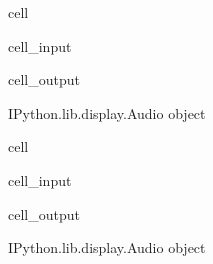 \documentclass[letterpaper,10pt,english]{jupyterBook}
\begin{document}
\begin{sphinxuseclass}{cell}\begin{sphinxVerbatimInput}

\begin{sphinxuseclass}{cell_input}
\begin{sphinxVerbatim}[commandchars=\\\{\}]
 
\end{sphinxVerbatim}

\end{sphinxuseclass}\end{sphinxVerbatimInput}
\begin{sphinxVerbatimOutput}

\begin{sphinxuseclass}{cell_output}
\begin{sphinxVerbatim}[commandchars=\\\{\}]
\PYGZlt{}IPython.lib.display.Audio object\PYGZgt{}
\end{sphinxVerbatim}

\end{sphinxuseclass}\end{sphinxVerbatimOutput}

\end{sphinxuseclass}
\begin{sphinxuseclass}{cell}\begin{sphinxVerbatimInput}

\begin{sphinxuseclass}{cell_input}
\begin{sphinxVerbatim}[commandchars=\\\{\}]
 
\end{sphinxVerbatim}

\end{sphinxuseclass}\end{sphinxVerbatimInput}
\begin{sphinxVerbatimOutput}

\begin{sphinxuseclass}{cell_output}
\begin{sphinxVerbatim}[commandchars=\\\{\}]
\PYGZlt{}IPython.lib.display.Audio object\PYGZgt{}
\end{sphinxVerbatim}

\end{sphinxuseclass}\end{sphinxVerbatimOutput}

\end{sphinxuseclass}
\sphinxstepscope
\end{document}

